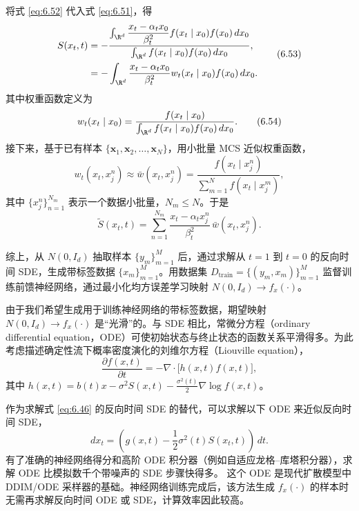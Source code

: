 将式 \eqref{eq:6.52} 代入式 \eqref{eq:6.51}，得
\begin{equation*}
  \begin{aligned}
  S(x_t,t)&=-\frac{\int_{\R^d}\dfrac{x_t-\alpha_t x_0}{\beta_t^2}
                        f(x_t\mid x_0)f(x_0)\,dx_0}
                     {\int_{\R^d}f(x_t\mid x_0)f(x_0)\,dx_0},\\
           &=-\int_{\R^d}\frac{x_t-\alpha_t x_0}{\beta_t^2}
                         w_t(x_t\mid x_0)f(x_0)\,dx_0.
  \end{aligned}
  \tag{6.53}\label{eq:6.53}
\end{equation*}
其中权重函数定义为
\begin{equation*}
  w_t(x_t\mid x_0)=\frac{f(x_t\mid x_0)}
                        {\int_{\R^d}f(x_t\mid x_0)f(x_0)\,dx_0}.
  \tag{6.54}\label{eq:6.54}
\end{equation*}
接下来，基于已有样本 $\{\boldsymbol x_1,\boldsymbol x_2,\ldots,\boldsymbol x_N\}$，用小批量 MCS 近似权重函数，
\[
  w_t(x_t,x_j^n)\approx\bar w(x_t,x_j^n)
   =\frac{f(x_t\mid x_j^n)}{\sum_{m=1}^N f(x_t\mid x_j^m)},
\]
其中 $\{x_j^n\}_{n=1}^{N_m}$ 表示一个数据小批量，$N_m\leq N$。于是
\[
  \tilde S(x_t,t)=\sum_{n=1}^{N_m}
       \frac{x_t-\alpha_t x_j^n}{\beta_t^2}\,\bar w(x_t,x_j^n).
\]

综上，从 $N(0,I_d)$ 抽取样本 $\{y_m\}_{m=1}^{M}$ 后，通过求解从 $t=1$ 到 $t=0$ 的反向时间 SDE，生成带标签数据 $\{x_m\}_{m=1}^{M}$。用数据集 $D_{\mathrm{train}}=\{(y_m,x_m)\}_{m=1}^{M}$ 监督训练前馈神经网络，通过最小化均方误差学习映射 $N(0,I_d)\to f_x(\cdot)$。

由于我们希望生成用于训练神经网络的带标签数据，期望映射 $N(0,I_d)\to f_x(\cdot)$ 是“光滑”的。与 SDE 相比，常微分方程（ordinary differential equation，ODE）可使初始状态与终止状态的函数关系平滑得多。为此考虑描述确定性流下概率密度演化的刘维尔方程（Liouville equation），
\begin{equation*}
  \frac{\partial f(x,t)}{\partial t}
    =-\nabla\cdot\bigl[h(x,t)f(x,t)\bigr],
  \tag{6.55}\label{eq:6.55}
\end{equation*}
其中 $h(x,t)=b(t)x-\sigma^2S(x,t)-\frac{\sigma^2(t)}2\nabla\log f(x,t)$。

作为求解式 \eqref{eq:6.46} 的反向时间 SDE 的替代，可以求解以下 ODE 来近似反向时间 SDE，
\begin{equation*}
  dx_t=\left(g(x,t)-\frac12\sigma^2(t)S(x_t,t)\right)\,dt.
  \tag{6.56}\label{eq:6.56}
\end{equation*}
有了准确的神经网络得分和高阶 ODE 积分器（例如自适应龙格–库塔积分器），求解 ODE 比模拟数千个带噪声的 SDE 步骤快得多。
这个 ODE 是现代扩散模型中 DDIM/ODE 采样器的基础。神经网络训练完成后，该方法生成 $f_x(\cdot)$ 的样本时无需再求解反向时间 ODE 或 SDE，计算效率因此较高。


